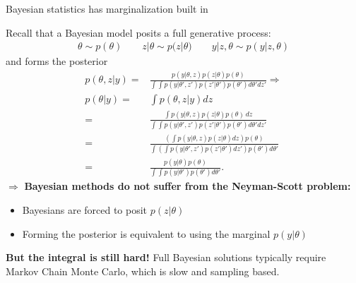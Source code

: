 \begin{frame}{Bayesian statistics has marginalization built in}


Recall that a Bayesian model posits a full generative process:
%
\begin{align*}
%
\theta \sim{} p(\theta) \quad\quad
z | \theta \sim{} p(z | \theta) \quad\quad
y | z, \theta \sim{} p(y | z, \theta)
%
\end{align*}
%
and forms the posterior
%
\begin{align*}
%
p(\theta, z \vert y) ={}& \frac{p(y | \theta, z) p(z | \theta) p(\theta)}
     {\int \int p(y | \theta', z') p(z' | \theta') p(\theta') d\theta' dz'} \Rightarrow\\
 p(\theta \vert y) ={}& \int p(\theta, z \vert y) dz \\
 ={}& \frac{\int p(y | \theta, z) p(z | \theta) p(\theta) \, dz}
      {\int\int p(y | \theta', z') p(z' | \theta') p(\theta') d\theta' dz'} \\
={}& \frac{\left(\int p(y | \theta, z) p(z | \theta)dz \right) p(\theta) }
   {\int\left( \int p(y | \theta', z') p(z' | \theta')dz'\right) p(\theta') d\theta' } \\
={}& \frac{ p(y | \theta) p(\theta) }
  {\int \int p(y | \theta') p(\theta') d\theta'}.
%
\end{align*}
%
$\Rightarrow$
\textbf{Bayesian methods do not suffer from the Neyman-Scott problem:}

\begin{itemize}
    \item Bayesians are forced to posit $p(z | \theta)$
    \item Forming the posterior is equivalent to using the marginal $p(y | \theta)$
\end{itemize}

\textbf{But the integral is still hard!}
%
Full Bayesian solutions typically require Markov Chain Monte Carlo, which is
slow and sampling based.

\end{frame}



